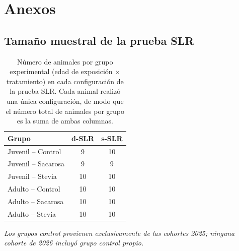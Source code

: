 \chapter*{Anexos}
\setcounter{section}{0}
\renewcommand{\thesection}{Anexo \Alph{section}}
\setcounter{table}{0}
\renewcommand{\thetable}{\Alph{section}.\arabic{table}}
\setcounter{figure}{0}
\renewcommand{\thefigure}{\Alph{section}.\arabic{figure}}

\section{Tamaño muestral de la prueba SLR}\label{anx:muestra}

\begin{table}[htbp]
\centering
\caption[Número de animales por grupo en la prueba SLR]{Número de animales por grupo experimental (edad de exposición $\times$ tratamiento) en cada configuración de la prueba SLR. Cada animal realizó una única configuración, de modo que el número total de animales por grupo es la suma de ambas columnas.}
\label{tab:n-slr}
\small
\begin{tabular}{@{}lcc@{}}
\toprule
\textbf{Grupo} & \textbf{d-SLR} & \textbf{s-SLR} \\
\midrule
Juvenil -- Control  & 9  & 10 \\
Juvenil -- Sacarosa & 9  & 9  \\
Juvenil -- Stevia   & 10 & 10 \\
Adulto -- Control   & 10 & 10 \\
Adulto -- Sacarosa  & 10 & 10 \\
Adulto -- Stevia    & 10 & 10 \\
\bottomrule
\end{tabular}

\vspace{0.4em}
\begin{minipage}{0.9\linewidth}
\footnotesize\textit{Los grupos control provienen exclusivamente de las cohortes 2025; ninguna cohorte de 2026 incluyó grupo control propio.}
\end{minipage}
\end{table}
